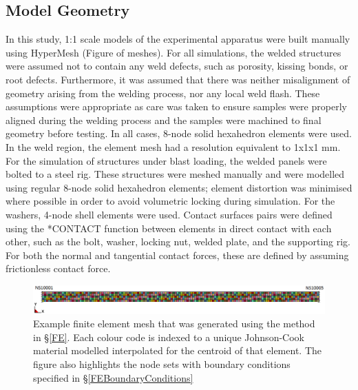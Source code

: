 \subsection{Model Geometry}
\label{FEModelGeometry}
In this study, 1:1 scale models of the experimental apparatus were built manually using HyperMesh (Figure of meshes). For all simulations, the welded structures were assumed not to contain any weld defects, such as porosity, kissing bonds, or root defects. Furthermore, it was assumed that there was neither misalignment of geometry arising from the welding process, nor any local weld flash. These assumptions were appropriate as care was taken to ensure samples were properly aligned during the welding process and the samples were machined to final geometry before testing. In all cases, 8-node solid hexahedron elements were used. In the weld region, the element mesh had a resolution equivalent to 1x1x1 mm. 
For the simulation of structures under blast loading, the welded panels were bolted to a steel rig. These structures were meshed manually and were modelled using regular 8-node solid hexahedron elements; element distortion was minimised where possible in order to avoid volumetric locking during simulation. For the washers, 4-node shell elements were used. Contact surfaces pairs were defined using the *CONTACT function between elements in direct contact with each other, such as the bolt, washer, locking nut, welded plate, and the supporting rig. For both the normal and tangential contact forces, these are defined by assuming frictionless contact force. 
\begin{figure}[h!]
	\centering
	\includegraphics[width=1\linewidth]{uniaxial_load}
	\caption[Mesh]{Example finite element mesh that was generated using the method in \S \ref{FE}. Each colour code is indexed to a unique Johnson-Cook material modelled interpolated for the centroid of that element. The figure also highlights the node sets with boundary conditions specified in \S \ref{FEBoundaryConditions}}	
	\label{fig:UniaxialMesh}
\end{figure} 
